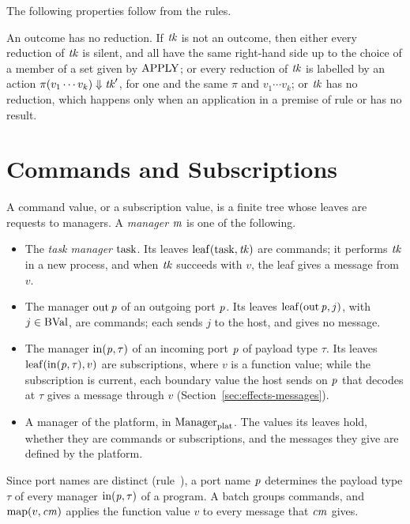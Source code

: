 The following properties follow from the rules.
\begin{property}
An outcome has no reduction. If $\mathit{tk}$ is not an outcome, then either every
reduction of $\mathit{tk}$ is silent, and all have the same right-hand side up to the
choice of a member of a set given by $\mathrm{APPLY}$; or every reduction of $\mathit{tk}$ is
labelled by an action $\pi(v_1\cdots v_k)\Downarrow \mathit{tk}'$, for one and the
same $\pi$ and $v_1\cdots v_k$; or $\mathit{tk}$ has no reduction, which happens only
when an application in a premise of rule 
or  has no result.
\end{property}

\section{Commands and Subscriptions}\label{sec:effects-commands}

A command value, or a subscription value, is a finite tree whose leaves are
requests to managers. A \emph{manager} $\mathit{m}$ is one of the following.
\begin{itemize}
\item The \emph{task manager} $\mathrm{task}$. Its leaves $\mathrm{leaf}(\mathrm{task},\mathit{tk})$
  are commands; it performs $\mathit{tk}$ in a new process, and when $\mathit{tk}$ succeeds
  with $v$, the leaf gives a message from $v$.
\item The manager $\mathrm{out}\,\mathit{p}$ of an outgoing port $\mathit{p}$. Its leaves
  $\mathrm{leaf}(\mathrm{out}\,\mathit{p},j)$, with $j\in\mathrm{BVal}$, are commands; each sends
  $j$ to the host, and gives no message.
\item The manager $\mathrm{in}(\mathit{p},\tau)$ of an incoming port $\mathit{p}$ of payload
  type $\tau$. Its leaves $\mathrm{leaf}(\mathrm{in}(\mathit{p},\tau),v)$ are subscriptions,
  where $v$ is a function value; while the subscription is current, each
  boundary value the host sends on $\mathit{p}$ that decodes at $\tau$ gives a message
  through $v$ (Section~\ref{sec:effects-messages}).
\item A manager of the platform, in $\mathrm{Manager}_{\mathrm{plat}}$. The values its leaves hold,
  whether they are commands or subscriptions, and the messages they give are
  defined by the platform. %
\end{itemize}
Since port names are distinct (rule~), a port name
$\mathit{p}$ determines the
payload type $\tau$ of every manager $\mathrm{in}(\mathit{p},\tau)$ of a program. A
batch groups commands, and $\mathrm{map}(v,\mathit{cm})$ applies the function value $v$ to
every message that $\mathit{cm}$ gives.

